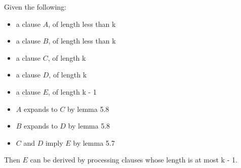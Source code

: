\documentclass[manuscript]{acmart}
\begin{document}
    \begin{lemma}
        Given the following:
        \begin{itemize}
            \item a clause $A$, of length less than k
            \item a clause $B$, of length less than k
            \item a clause $C$, of length k
            \item a clause $D$, of length k
            \item a clause $E$, of length k - 1
            \item $A$ expands to $C$ by lemma 5.8
            \item $B$ expands to $D$ by lemma 5.8
            \item $C$ and $D$ imply $E$ by lemma 5.7
        \end{itemize}
        Then $E$ can be derived by processing clauses whose length
        is at most k - 1.
    \end{lemma}
\end{document}
